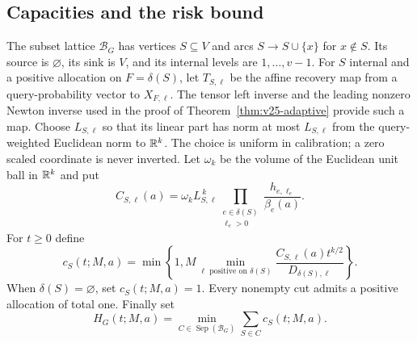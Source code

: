 \subsection{Capacities and the risk bound}
The subset lattice $\mathscr B_G$ has vertices $S\subseteq V$ and
arcs $S\to S\cup\{x\}$ for $x\notin S$. Its source is
$\varnothing$, its sink is $V$, and its internal levels are
$1,\ldots,v-1$. For $S$ internal and a positive allocation on
$F=\delta(S)$, let $T_{S,\ell}$ be the affine recovery map from a
query-probability vector to $X_{F,\ell}$. The tensor left inverse and
the leading nonzero Newton inverse used in the proof of
Theorem~\ref{thm:v25-adaptive} provide such a map. Choose $L_{S,\ell}$
so that its linear part has norm at most $L_{S,\ell}$ from the
query-weighted Euclidean norm to $\mathbb R^k$. The choice is uniform in
calibration; a zero scaled coordinate is never inverted.
Let $\omega_k$ be the volume of the Euclidean unit ball in $\mathbb R^k$ and put
\begin{equation}\label{eq:v26-capacity-constant}
 C_{S,\ell}(a)=\omega_kL_{S,\ell}^{\,k}
       \prod_{\substack{e\in\delta(S)\\\ell_e>0}}
                           \frac{h_{e,\ell_e}}{\beta_e(a)}.
\end{equation}
For $t\ge0$ define
\begin{equation}\label{eq:v26-node-capacity}
 c_S(t;M,a)=\min\left\{1,
       M\min_{\ell\text{ positive on }\delta(S)}
                   \frac{C_{S,\ell}(a)t^{k/2}}{D_{\delta(S),\ell}}
                         \right\}.
\end{equation}
When $\delta(S)=\varnothing$, set $c_S(t;M,a)=1$.
Every nonempty cut admits a positive allocation of total one.
Finally set
\[
 H_G(t;M,a)=\min_{C\in\operatorname{Sep}(\mathscr B_G)}
                                      \sum_{S\in C}c_S(t;M,a).
\]


